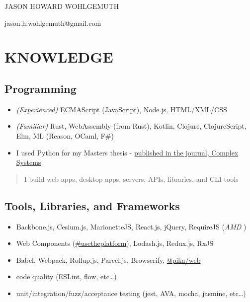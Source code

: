 \documentclass[10pt]{article}
\def\tightlist{}
\begin{document}
\begin{center}\Huge {JASON HOWARD WOHLGEMUTH}\end{center}
\begin{center}jason.h.wohlgemuth@gmail.com\end{center}

\section{KNOWLEDGE}\label{knowledge}

\subsection{Programming}\label{programming}

\begin{itemize}
\tightlist
\item
  \emph{(Experienced)} ECMAScript (JavaScript), Node.js, HTML/XML/CSS
\item
  \emph{(Familiar)} Rust, WebAssembly (from Rust), Kotlin, Clojure,
  ClojureScript, Elm, ML (Reason, OCaml, F\#)
\item
  I used Python for my Masters thesis -
  \href{https://www.complex-systems.com/abstracts/v23_i03_a01/}{published
  in the journal, Complex Systems}
\end{itemize}

\begin{quote}
I build web apps, desktop apps, servers, APIs, libraries, and CLI tools
\end{quote}

\subsection{Tools, Libraries, and
Frameworks}\label{tools-libraries-and-frameworks}

\begin{itemize}
\tightlist
\item
  Backbone.js, Cesium.js, MarionetteJS, React.js, jQuery, RequireJS
  (\emph{AMD })
\item
  Web Components
  (\href{https://twitter.com/hashtag/usetheplatform?src=hash}{\#usetheplatform}),
  Lodash.js, Redux.js, RxJS
\item
  Babel, Webpack, Rollup.js, Parcel.js, Browserify,
  \href{https://www.pika.dev/blog/pika-web-a-future-without-webpack/}{@pika/web}
\item
  code quality (ESLint, flow, etc\ldots{})
\item
  unit/integration/fuzz/acceptance testing (jest, AVA, mocha, jasmine,
  etc\ldots{})
\end{itemize}
\end{document}
